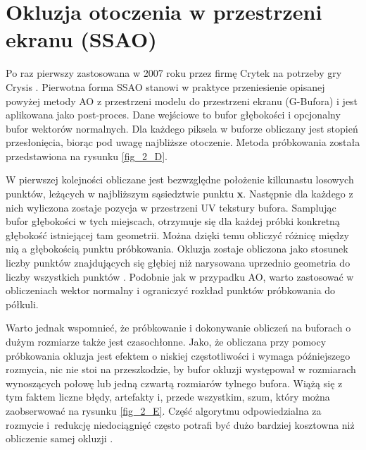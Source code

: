 	\section{Okluzja otoczenia w przestrzeni ekranu (SSAO)}
	\label{t:teoria:ssao}
	
	Po raz pierwszy zastosowana w 2007 roku przez firmę Crytek na potrzeby gry Crysis \cite{crytek}. Pierwotna forma SSAO stanowi w praktyce przeniesienie opisanej powyżej metody AO z przestrzeni modelu do przestrzeni ekranu (G-Bufora) i jest aplikowana jako post-proces. Dane wejściowe to bufor głębokości i opcjonalny bufor wektorów normalnych. Dla każdego piksela w buforze obliczany jest stopień przesłonięcia, biorąc pod uwagę najbliższe otoczenie. Metoda próbkowania została przedstawiona na rysunku \ref{fig_2_D}.
	
	
	W pierwszej kolejności obliczane jest bezwzględne położenie kilkunastu losowych punktów, leżących w najbliższym sąsiedztwie punktu \textbf{x}. Następnie dla każdego z nich wyliczona zostaje pozycja w przestrzeni UV tekstury bufora. Samplując bufor głębokości w tych miejscach, otrzymuje się dla każdej próbki konkretną głębokość istniejącej tam geometrii. Można dzięki temu obliczyć różnicę między nią a głębokością punktu próbkowania. Okluzja zostaje obliczona jako stosunek liczby punktów znajdujących się głębiej niż narysowana uprzednio geometria do liczby wszystkich punktów \cite{luna}. Podobnie jak w przypadku AO, warto zastosować w obliczeniach wektor normalny i ograniczyć rozkład punktów próbkowania do półkuli.
	
	
	
	Warto jednak wspomnieć, że próbkowanie i dokonywanie obliczeń na buforach o dużym rozmiarze także jest czasochłonne. Jako, że obliczana przy pomocy próbkowania okluzja jest efektem o niskiej częstotliwości i wymaga późniejszego rozmycia, nic nie stoi na przeszkodzie, by bufor okluzji występował w rozmiarach wynoszących połowę lub jedną czwartą rozmiarów tylnego bufora. Wiążą się z tym faktem liczne błędy, artefakty i, przede wszystkim, szum, który można zaobserwować na rysunku \ref{fig_2_E}. Część algorytmu odpowiedzialna za rozmycie i~redukcję niedociągnięć często potrafi być dużo bardziej kosztowna niż obliczenie samej okluzji \cite{statvo}.
	
